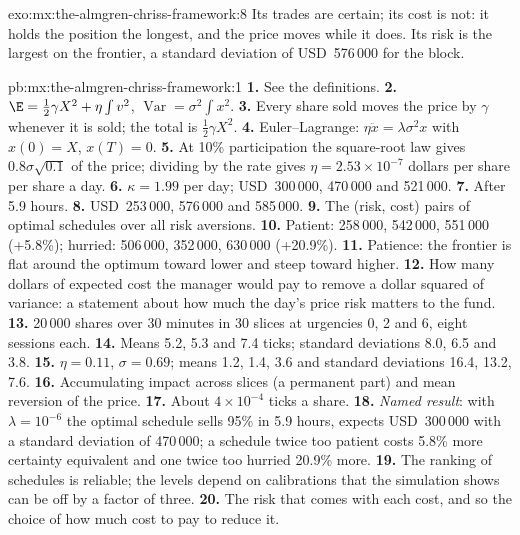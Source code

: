 \begin{solution}{exo:mx:the-almgren-chriss-framework:8}
Its trades are certain; its cost is not: it holds the position the longest, and the price moves while it does. Its risk is the largest on the frontier,
a standard deviation of USD~576\,000 for the block.
\end{solution}

\begin{solution}{pb:mx:the-almgren-chriss-framework:1}
\textbf{1.} See the definitions.
\textbf{2.} $\E=\tfrac12\gamma X^2+\eta\int v^2$, $\operatorname{Var}=\sigma^2\int x^2$.
\textbf{3.} Every share sold moves the price by $\gamma$ whenever it is sold; the total is $\tfrac12\gamma X^2$.
\textbf{4.} Euler--Lagrange: $\eta\ddot x=\lambda\sigma^2x$ with $x(0)=X$, $x(T)=0$.
\textbf{5.} At 10\% participation the square-root law gives $0.8\sigma\sqrt{0.1}$ of the price; dividing by the rate gives $\eta=2.53\times10^{-7}$ dollars per share
per share a day.
\textbf{6.} $\kappa=1.99$ per day; USD~300\,000, 470\,000 and 521\,000.
\textbf{7.} After 5.9 hours.
\textbf{8.} USD~253\,000, 576\,000 and 585\,000.
\textbf{9.} The (risk, cost) pairs of optimal schedules over all risk aversions.
\textbf{10.} Patient: 258\,000, 542\,000, 551\,000 (+5.8\%); hurried: 506\,000, 352\,000, 630\,000 (+20.9\%).
\textbf{11.} Patience: the frontier is flat around the optimum toward lower  and steep toward higher.
\textbf{12.} How many dollars of expected cost the manager would pay to remove a dollar squared of variance: a statement about how much the day's price risk
matters to the fund.
\textbf{13.} 20\,000 shares over 30 minutes in 30 slices at urgencies 0, 2 and 6, eight sessions each.
\textbf{14.} Means 5.2, 5.3 and 7.4 ticks; standard deviations 8.0, 6.5 and 3.8.
\textbf{15.} $\eta=0.11$, $\sigma=0.69$; means 1.2, 1.4, 3.6 and standard deviations 16.4, 13.2, 7.6.
\textbf{16.} Accumulating impact across slices (a permanent part) and mean reversion of the price.
\textbf{17.} About $4\times10^{-4}$ ticks a share.
\textbf{18.} \emph{Named result}: with $\lambda=10^{-6}$ the optimal schedule sells 95\% in 5.9 hours, expects USD~300\,000 with a standard deviation of 470\,000;
a schedule twice too patient costs 5.8\% more certainty equivalent and one twice too hurried 20.9\% more.
\textbf{19.} The ranking of schedules is reliable; the levels depend on calibrations that the simulation shows can be off by a factor of three.
\textbf{20.} The risk that comes with each cost, and so the choice of how much cost to pay to reduce it.
\end{solution}

